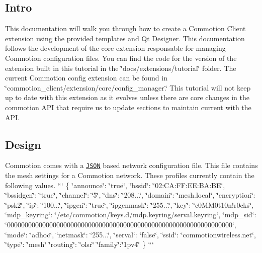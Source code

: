 \subsection*{Intro}

This documentation will walk you through how to create a Commotion Client extension using the provided templates and Qt Designer. This documentation follows the development of the core extension responsable for managing Commotion configuration files. You can find the code for the version of the extension built in this tutorial in the \char`\"{}docs/extensions/tutorial\char`\"{} folder. The current Commotion config extension can be found in \char`\"{}commotion\+\_\+client/extension/core/config\+\_\+manager.\char`\"{} This tutorial will not keep up to date with this extension as it evolves unless there are core changes in the commotion A\+P\+I that require us to update sections to maintain current with the A\+P\+I.

\subsection*{Design}

Commotion comes with a \href{http://json.org/}{\tt J\+S\+O\+N} based network configuration file. This file contains the mesh settings for a Commotion network. These profiles currently contain the following values. ``` \{ \char`\"{}announce\char`\"{}\+: \char`\"{}true\char`\"{}, \char`\"{}bssid\char`\"{}\+: \char`\"{}02\+:\+C\+A\+:\+F\+F\+:\+E\+E\+:\+B\+A\+:\+B\+E\char`\"{}, \char`\"{}bssidgen\char`\"{}\+: \char`\"{}true\char`\"{}, \char`\"{}channel\char`\"{}\+: \char`\"{}5\char`\"{}, \char`\"{}dns\char`\"{}\+: \char`\"{}208...\char`\"{}, \char`\"{}domain\char`\"{}\+: \char`\"{}mesh.\+local\char`\"{}, \char`\"{}encryption\char`\"{}\+: \char`\"{}psk2\char`\"{}, \char`\"{}ip\char`\"{}\+: \char`\"{}100...\char`\"{}, \char`\"{}ipgen\char`\"{}\+: \char`\"{}true\char`\"{}, \char`\"{}ipgenmask\char`\"{}\+: \char`\"{}255...\char`\"{}, \char`\"{}key\char`\"{}\+: \char`\"{}c0\+M\+M0t10n!r0cks\char`\"{}, \char`\"{}mdp\+\_\+keyring\char`\"{}\+: \char`\"{}/etc/commotion/keys.\+d/mdp.\+keyring/serval.\+keyring\char`\"{}, \char`\"{}mdp\+\_\+sid\char`\"{}\+: \char`\"{}0000000000000000000000000000000000000000000000000000000000000000\char`\"{}, \char`\"{}mode\char`\"{}\+: \char`\"{}adhoc\char`\"{}, \char`\"{}netmask\char`\"{}\+: \char`\"{}255...\char`\"{}, \char`\"{}serval\char`\"{}\+: \char`\"{}false\char`\"{}, \char`\"{}ssid\char`\"{}\+: \char`\"{}commotionwireless.\+net\char`\"{}, \char`\"{}type\char`\"{}\+: \char`\"{}mesh\char`\"{} \char`\"{}routing\char`\"{}\+: \char`\"{}olsr\char`\"{} \char`\"{}family\char`\"{}\+:\char`\"{}1pv4\char`\"{} \} ```

